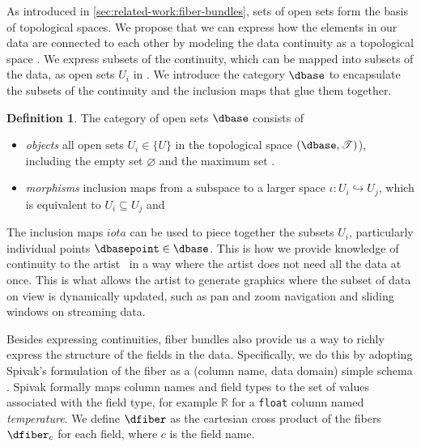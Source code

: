 \documentclass[10pt,journal,compsoc]{IEEEtran}
\theoremstyle{definition}
\newtheorem{definition}{Definition}[section]
\theoremstyle{remark}
\begin{document}
As introduced in \autoref{sec:related-work:fiber-bundles}, sets of open sets form the basis of topological spaces. We propose that we can express how the elements in our data are connected to each other by modeling the data continuity as a topological space \dbase. We express subsets of the continuity, which can be mapped into subsets of the data, as open sets $U_{i}$ in \dbase. We introduce the category $\mathcal{\dbase}$ to encapsulate the subsets of the continuity and the inclusion maps that glue them together. 

\begin{definition} The category of open sets $\mathcal{\dbase}$ consists of
  \label{def:category:K} 
  \begin{itemize}
    \item \textit{objects} all open sets $U_{i} \in \{U\}$ in the topological space $(\dbase, \mathscr{T})$), including the empty set $\varnothing$ and the maximum set \dbase. 
    \item \textit{morphisms} inclusion maps from a subspace to a larger space $\iota: U_{i} \hookrightarrow U_{j}$, which is equivalent to $U_{i} \subseteq U_{j}$ and  
  \end{itemize} 
\end{definition}

The inclusion maps $iota$ can be used to piece together the subsets $U_{i}$, particularly individual points $\dbasepoint \in \dbase$. This is how we provide knowledge of continuity to the artist \vartist\ in a way where the artist does not need all the data at once. This is what allows the artist to generate graphics where the subset of data on view is dynamically updated, such as pan and zoom navigation\cite{NekrasovskiEvaluationPanZoom2006} and sliding windows on streaming data\cite{crouchDynamicGraphsSlidingwindow2013,chuTimeSeriesSegmentation1995}.

Besides expressing continuities, fiber bundles also provide us a way to richly express the structure of the fields in the data. Specifically, we do this by adopting Spivak's formulation of the fiber as a (column name, data domain) simple schema \cite{spivakSIMPLICIALDATABASES,spivakDatabasesAreCategories2010}. Spivak formally maps column names and field types to the set of values associated with the field type, for example $\mathbb{R}$ for a \texttt{float} column named \textit{temperature}. We define $\dfiber$ as  the cartesian cross product of the fibers $\dfiber_c$ for each field, where $c$ is the field name.  
\end{document}
